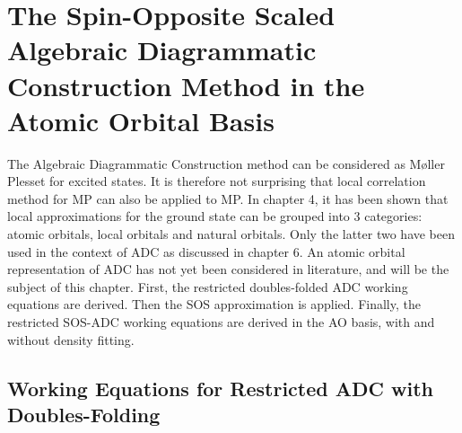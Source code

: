 \chapter{The Spin-Opposite Scaled Algebraic Diagrammatic Construction Method in the Atomic Orbital Basis \label{cha:AOADC}}

The Algebraic Diagrammatic Construction method can be considered as M{\o}ller Plesset for excited states. It is therefore not surprising that local correlation method for MP can also be applied to MP. In chapter 4, it has been shown that local approximations for the ground state can be grouped into 3 categories: atomic orbitals, local orbitals and natural orbitals. Only the latter two have been used in the context of ADC as discussed in chapter 6. An atomic orbital representation of ADC has not yet been considered in literature, and will be the subject of this chapter. First, the restricted doubles-folded ADC working equations are derived. Then the SOS approximation is applied. Finally, the restricted SOS-ADC working equations are derived in the AO basis, with and without density fitting. 

\section{Working Equations for Restricted ADC with Doubles-Folding}

